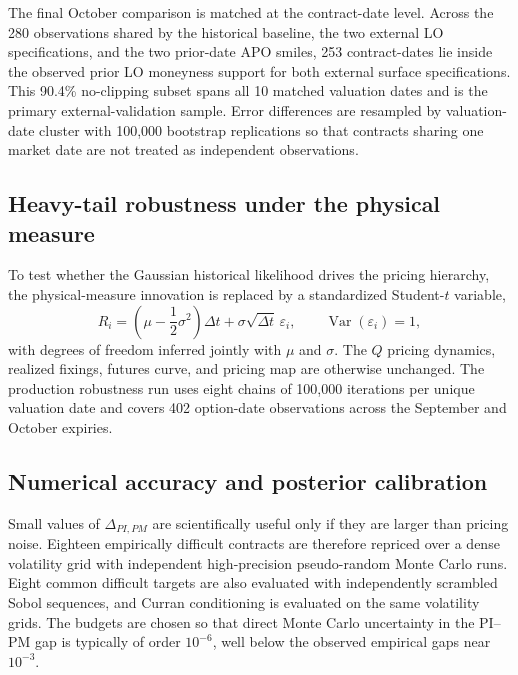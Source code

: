 The final October comparison is matched at the contract-date level. Across the 280 observations shared by the historical baseline, the two external LO specifications, and the two prior-date APO smiles, 253 contract-dates lie inside the observed prior LO moneyness support for both external surface specifications. This 90.4\% no-clipping subset spans all 10 matched valuation dates and is the primary external-validation sample. Error differences are resampled by valuation-date cluster with 100,000 bootstrap replications so that contracts sharing one market date are not treated as independent observations.

\subsection{Heavy-tail robustness under the physical measure}

To test whether the Gaussian historical likelihood drives the pricing hierarchy, the physical-measure innovation is replaced by a standardized Student-$t$ variable,
\begin{equation}
 R_i=
 \left(\mu-\frac12\sigma^2\right)\Delta t
 +\sigma\sqrt{\Delta t}\,\varepsilon_i,
 \qquad
 \operatorname{Var}(\varepsilon_i)=1,
\end{equation}
with degrees of freedom inferred jointly with $\mu$ and $\sigma$. The $Q$ pricing dynamics, realized fixings, futures curve, and pricing map are otherwise unchanged. The production robustness run uses eight chains of 100,000 iterations per unique valuation date and covers 402 option-date observations across the September and October expiries.

\subsection{Numerical accuracy and posterior calibration}

Small values of $\Delta_{PI,PM}$ are scientifically useful only if they are larger than pricing noise. Eighteen empirically difficult contracts are therefore repriced over a dense volatility grid with independent high-precision pseudo-random Monte Carlo runs. Eight common difficult targets are also evaluated with independently scrambled Sobol sequences, and Curran conditioning is evaluated on the same volatility grids. The budgets are chosen so that direct Monte Carlo uncertainty in the PI--PM gap is typically of order $10^{-6}$, well below the observed empirical gaps near $10^{-3}$.

